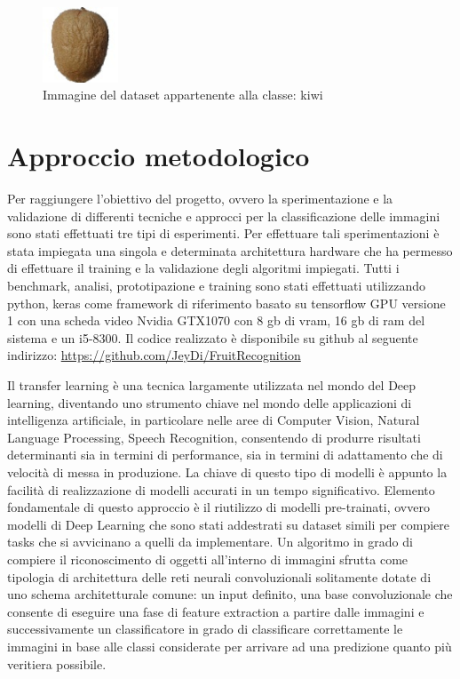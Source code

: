 \begin{figure}[H]
    \centering
    \includegraphics[width=0.2\textwidth]{./resources/kiwi.jpg}
    \caption{Immagine del dataset appartenente alla classe: kiwi} 
    \label{fig:kiwi}
\end{figure}

\section{Approccio metodologico}

Per raggiungere l'obiettivo del progetto, ovvero la sperimentazione e la validazione di differenti tecniche e approcci per la classificazione delle immagini sono stati effettuati tre tipi di esperimenti.  
Per effettuare tali sperimentazioni è stata impiegata una singola e determinata architettura hardware che ha permesso di effettuare il training e la validazione degli algoritmi impiegati.  
Tutti i benchmark, analisi, prototipazione e training sono stati effettuati utilizzando python, keras come framework di riferimento basato su tensorflow GPU versione 1 con una scheda video Nvidia GTX1070 con 8 gb di vram, 16 gb di ram del sistema e un i5-8300.  
Il codice realizzato è disponibile su github al seguente indirizzo:  \url{https://github.com/JeyDi/FruitRecognition} \bigskip

Il transfer learning è una tecnica largamente utilizzata nel mondo del Deep learning, diventando uno strumento chiave nel mondo delle applicazioni di intelligenza artificiale, in particolare nelle aree di Computer Vision, Natural Language Processing, Speech Recognition, consentendo di produrre risultati determinanti sia in termini di performance, sia in termini di adattamento che di velocità di messa in produzione.  
La chiave di questo tipo di modelli è appunto la facilità di realizzazione di modelli accurati in un tempo significativo.  
Elemento fondamentale di questo approccio è il riutilizzo di modelli pre-trainati, ovvero modelli di Deep Learning che sono stati addestrati su dataset simili per compiere tasks che si avvicinano a quelli da implementare.  
Un algoritmo in grado di compiere il riconoscimento di oggetti all'interno di immagini sfrutta come tipologia di architettura delle reti neurali convoluzionali solitamente dotate di uno schema architetturale comune: un input definito, una base convoluzionale che consente di eseguire una fase di feature extraction a partire dalle immagini e successivamente un classificatore in grado di classificare correttamente le immagini in base alle classi considerate per arrivare ad una predizione quanto più veritiera possibile. 


